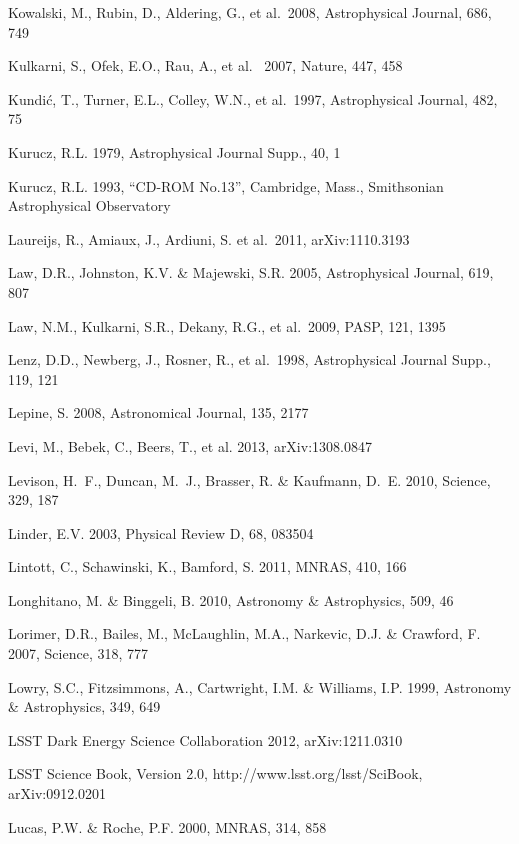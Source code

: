\documentclass{emulateapj}
\begin{document}
\begin{thebibliography}{}
\bibitem[()]{} Kowalski, M., Rubin, D., Aldering, G., et al.~2008,  Astrophysical Journal, 686, 749

\bibitem[()]{} Kulkarni, S., Ofek, E.O., Rau, A., et al.~ 2007, Nature, 447, 458

\bibitem[()]{} Kundi\'{c}, T., Turner, E.L., Colley, W.N., et al.~1997, Astrophysical Journal, 482, 75

\bibitem[()]{} Kurucz, R.L. 1979, Astrophysical Journal Supp., 40, 1

\bibitem[()]{} Kurucz, R.L. 1993, ``CD-ROM No.13”, Cambridge, Mass., Smithsonian Astrophysical Observatory

\bibitem[()]{} Laureijs, R., Amiaux, J., Ardiuni, S. et al.~2011, arXiv:1110.3193

\bibitem[()]{} Law, D.R., Johnston, K.V. \& Majewski, S.R. 2005,  Astrophysical Journal, 619, 807

\bibitem[()]{} Law, N.M., Kulkarni, S.R., Dekany, R.G., et al.~2009, PASP, 121, 1395

\bibitem[()]{} Lenz, D.D., Newberg, J., Rosner, R., et al.~1998, Astrophysical Journal Supp., 119, 121

\bibitem[()]{} Lepine, S. 2008, Astronomical Journal, 135, 2177

\bibitem[()]{} Levi, M., Bebek, C., Beers, T., et al. 2013, arXiv:1308.0847

\bibitem[()]{} Levison, H.~F., Duncan, M.~J., Brasser, R. \& Kaufmann, D.~E. 2010, Science, 329, 187

\bibitem[()]{} Linder, E.V. 2003, Physical Review D, 68, 083504
	
\bibitem[()]{} Lintott, C., Schawinski, K., Bamford, S. 2011, MNRAS,
  410, 166

\bibitem[()]{} Longhitano, M. \& Binggeli, B. 2010, Astronomy \& Astrophysics, 509, 46

\bibitem[()]{} Lorimer, D.R., Bailes, M., McLaughlin, M.A., Narkevic, D.J. \& Crawford, F. 2007, Science, 318, 777	

\bibitem[()]{} Lowry, S.C., Fitzsimmons, A., Cartwright, I.M. \& Williams, I.P. 1999, Astronomy \& 
             Astrophysics, 349, 649

\bibitem[()]{} LSST Dark Energy Science Collaboration 2012, arXiv:1211.0310

\bibitem[()]{} LSST Science Book, Version 2.0,
  http://www.lsst.org/lsst/SciBook, arXiv:0912.0201

\bibitem[()]{} Lucas, P.W. \& Roche, P.F. 2000, MNRAS, 314, 858
	

\end{thebibliography}
\end{document}
